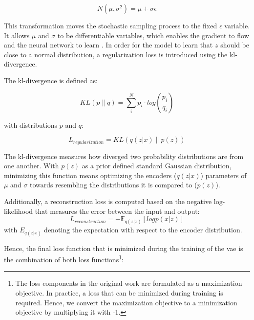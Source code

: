 \begin{equation}
  \label{eqn:reparameterization}
  N(\mu,\sigma^2) =\mu+\sigma\epsilon
\end{equation}


This transformation moves the stochastic sampling process to the fixed $\epsilon$ variable. 
It allows $\mu$ and $\sigma$ to be differentiable variables, which enables the gradient to flow and the neural network to learn \cite{kingma2013AutoEncodingVariationalBayes}.
In order for the \gls{model} to learn that $z$ should be close to a normal distribution, a regularization loss is introduced using the \gls{kl}-divergence.

\noindent The \gls{kl}-divergence is defined as:

\begin{equation}
    \label{eqn:kl-divergence}
    KL(p\parallel q) = \sum_{i}^{N}p_i\cdot log(\frac{p_i}{q_i})
\end{equation}

with distributions $p$ and $q$:

\begin{equation}
    \label{eqn:regularization_loss}
    L_{regularization} = KL(q(z|x) \parallel p(z))
\end{equation}

The \gls{kl}-divergence measures how diverged two probability distributions are from one another.
With $p(z)$ as a prior defined standard Gaussian distribution, minimizing this function means optimizing the encoders ($q(z|x)$) parameters of $\mu$ and $\sigma$ towards resembling the distributions it is compared to ($p(z)$).

\noindent Additionally, a reconstruction loss is computed based on the negative log-likelihood that measures the error between the input and output:
\begin{equation}
    \label{eqn:reconstruction_loss}
    L_{reconstruction} =-\mathbb{E}_{q(z|x)}[logp(x|z)]
\end{equation}
with $E_{q(z|x)}$ denoting the expectation with respect to the encoder distribution.

Hence, the final loss function that is minimized during the training of the \gls{vae} is the combination of both loss functions\footnote{The loss components in the original work \cite{kingma2013AutoEncodingVariationalBayes} are formulated as a maximization objective. In practice, a loss that can be minimized during training is required. Hence, we convert the maximization objective to a minimization objective by multiplying it with -1.}:

